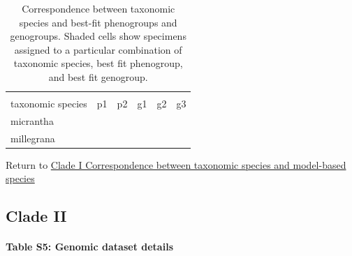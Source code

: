 \documentclass[
  11pt,
]{article}
\begin{document}
\begin{table}[H]

\caption{\label{tab:cladeIfinalSummary}Correspondence between taxonomic species and best-fit phenogroups and genogroups. Shaded cells show specimens assigned to a particular combination of taxonomic species, best fit phenogroup, and best fit genogroup.}
\centering
\fontsize{8}{10}\selectfont
\begin{tabular}[t]{>{\raggedright\arraybackslash}p{15mm}|>{\raggedright\arraybackslash}p{5mm}|>{\raggedright\arraybackslash}p{5mm}||>{\raggedright\arraybackslash}p{5mm}|>{\raggedright\arraybackslash}p{5mm}|>{\raggedright\arraybackslash}p{5mm}|}
\toprule
\multicolumn{1}{c}{} & \multicolumn{2}{c}{Phenogroups} & \multicolumn{3}{c}{Genogroups} \\
\cmidrule(l{3pt}r{3pt}){2-3} \cmidrule(l{3pt}r{3pt}){4-6}
taxonomic species & p1 & p2 & g1 & g2 & g3\\
\midrule
micrantha & \cellcolor[HTML]{BBBBBB}{\textcolor[HTML]{BBBBBB}{1}} & \cellcolor[HTML]{FFFFFF}{\textcolor[HTML]{FFFFFF}{0}} & \cellcolor[HTML]{FFFFFF}{\textcolor[HTML]{FFFFFF}{0}} & \cellcolor[HTML]{FFFFFF}{\textcolor[HTML]{FFFFFF}{0}} & \cellcolor[HTML]{BBBBBB}{\textcolor[HTML]{BBBBBB}{1}}\\
\midrule
millegrana & \cellcolor[HTML]{FFFFFF}{\textcolor[HTML]{FFFFFF}{0}} & \cellcolor[HTML]{BBBBBB}{\textcolor[HTML]{BBBBBB}{1}} & \cellcolor[HTML]{BBBBBB}{\textcolor[HTML]{BBBBBB}{1}} & \cellcolor[HTML]{BBBBBB}{\textcolor[HTML]{BBBBBB}{1}} & \cellcolor[HTML]{FFFFFF}{\textcolor[HTML]{FFFFFF}{0}}\\
\bottomrule
\end{tabular}
\end{table}

Return to \protect\hyperlink{correspondence-between-taxonomic-species-and-model-based-species}{Clade I Correspondence between taxonomic species and model-based species}
\pagebreak

\hypertarget{clade-ii-1}{%
\subsection{Clade II}\label{clade-ii-1}}

\hypertarget{table-s5-genomic-dataset-details}{%
\paragraph{Table S5: Genomic dataset details}\label{table-s5-genomic-dataset-details}}
\end{document}
